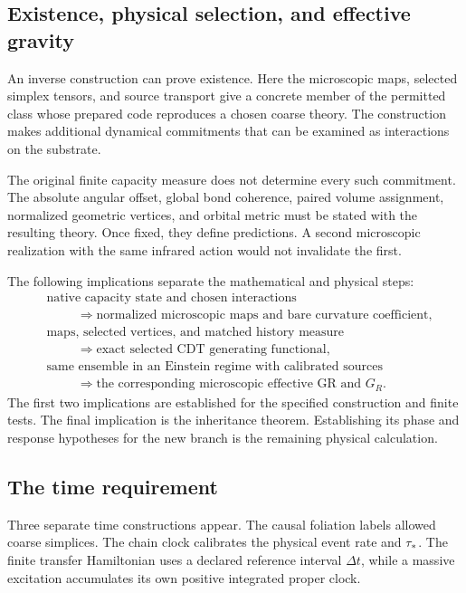 \subsection{Existence, physical selection, and effective gravity}

An inverse construction can prove existence. Here the microscopic maps, selected simplex tensors, and source transport give a concrete member of the permitted class whose prepared code reproduces a chosen coarse theory. The construction makes additional dynamical commitments that can be examined as interactions on the substrate.

The original finite capacity measure does not determine every such commitment. The absolute angular offset, global bond coherence, paired volume assignment, normalized geometric vertices, and orbital metric must be stated with the resulting theory. Once fixed, they define predictions. A second microscopic realization with the same infrared action would not invalidate the first.

The following implications separate the mathematical and physical steps:
\begin{align}
&\text{native capacity state and chosen interactions}
\nonumber\\[-2pt]
&\hspace{1cm}\Longrightarrow
\text{normalized microscopic maps and bare curvature coefficient},
\\
&\text{maps, selected vertices, and matched history measure}
\nonumber\\[-2pt]
&\hspace{1cm}\Longrightarrow
\text{exact selected CDT generating functional},
\\
&\text{same ensemble in an Einstein regime with calibrated sources}
\nonumber\\[-2pt]
&\hspace{1cm}\Longrightarrow
\text{the corresponding microscopic effective GR and }G_R.
\end{align}
The first two implications are established for the specified construction and finite tests. The final implication is the inheritance theorem. Establishing its phase and response hypotheses for the new branch is the remaining physical calculation.

\subsection{The time requirement}

Three separate time constructions appear. The causal foliation labels allowed coarse simplices. The chain clock calibrates the physical event rate and $\tau_*$. The finite transfer Hamiltonian uses a declared reference interval $\Delta t$, while a massive excitation accumulates its own positive integrated proper clock.


